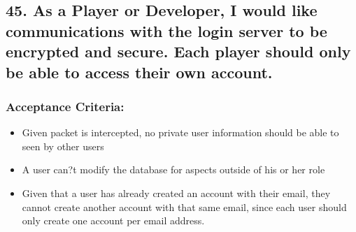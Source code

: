 \subsection*{45. As a Player or Developer, I would like communications with the login server to be encrypted and secure. Each player should only be able to access their own account. 
}


\subsubsection*{Acceptance Criteria:}

\begin{itemize}
\item Given packet is intercepted, no private user information should be able to seen by other users
\item A user can?t modify the database for aspects outside of his or her role
\item Given that a user has already created an account with their email, they cannot create another account with that same email, since each user should only create one account per email address.
\end{itemize}
